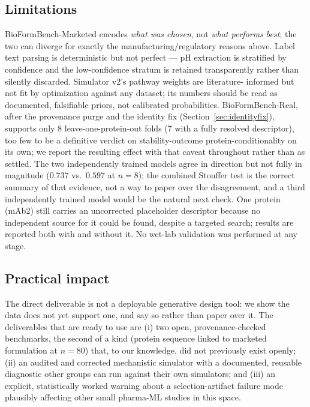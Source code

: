 \documentclass[twocolumn,10pt]{article}
\begin{document}
\subsection{Limitations}
\label{sec:limitations}

BioFormBench-Marketed encodes \emph{what was chosen}, not \emph{what performs
best}; the two can diverge for exactly the manufacturing/regulatory reasons
above. Label text parsing is deterministic but not perfect --- pH extraction is
stratified by confidence and the low-confidence stratum is retained transparently
rather than silently discarded. Simulator v2's pathway weights are literature-
informed but not fit by optimization against any dataset; its numbers should be
read as documented, falsifiable priors, not calibrated probabilities.
BioFormBench-Real, after the provenance purge and the identity fix
(Section~\ref{sec:identityfix}), supports only 8 leave-one-protein-out folds
(7 with a fully resolved descriptor), too few to be a definitive verdict on
stability-outcome protein-conditionality on its own; we report the resulting
effect with that caveat throughout rather than as settled. The two independently
trained models agree in direction but not fully in magnitude ($0.737$ vs.\
$0.597$ at $n=8$); the combined Stouffer test is the correct summary of that
evidence, not a way to paper over the disagreement, and a third independently
trained model would be the natural next check. One protein (mAb2) still carries
an uncorrected placeholder descriptor because no independent source for it
could be found, despite a targeted search; results are reported both with and
without it. No wet-lab validation was performed at any stage.

\subsection{Practical impact}

The direct deliverable is not a deployable generative design tool: we show the
data does not yet support one, and say so rather than paper over it. The
deliverables that are ready to use are (i) two open, provenance-checked
benchmarks, the second of a kind (protein sequence linked to marketed formulation
at $n=80$) that, to our knowledge, did not previously exist openly; (ii) an
audited and corrected mechanistic simulator with a documented, reusable
diagnostic other groups can run against their own simulators; and (iii) an
explicit, statistically worked warning about a selection-artifact failure mode
plausibly affecting other small pharma-ML studies in this space.
\end{document}
